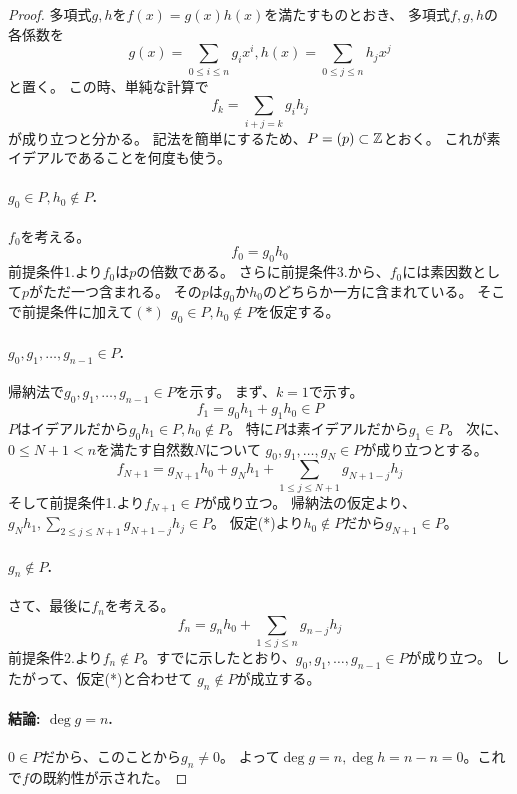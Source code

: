 \documentclass[a4j]{jsarticle}
\begin{document}
\begin{proof}
    多項式$g,h$を$f(x)=g(x) h(x)$を満たすものとおき、
    多項式$f, g, h$の各係数を
    \[ g(x)=\sum_{0 \leq i \leq n}{g_i x^i}, h(x)=\sum_{0 \leq j \leq n}{h_j x^j} \]
    と置く。
    この時、単純な計算で
    \[ f_{k}=\sum_{i+j=k}{g_i h_j} \]
    が成り立つと分かる。
    記法を簡単にするため、$P=(p) \subset \mathbb{Z}$とおく。
    これが素イデアルであることを何度も使う。

    \paragraph{$g_0 \in P, h_0 \not \in P$.}
    $f_0$を考える。
    \[ f_0=g_0 h_0 \]
    前提条件1.より$f_0$は$p$の倍数である。
    さらに前提条件3.から、$f_0$には素因数として$p$がただ一つ含まれる。
    その$p$は$g_0$か$h_0$のどちらか一方に含まれている。
    そこで前提条件に加えて$(*)~~g_0 \in P, h_0 \not \in P$を仮定する。

    \paragraph{$g_0, g_1, \dots, g_{n-1} \in P$.}
    帰納法で$g_0, g_1, \dots, g_{n-1} \in P$を示す。
    まず、$k=1$で示す。
    \[ f_1=g_0 h_1 + g_1 h_0 \in P \]
    $P$はイデアルだから$g_0 h_1 \in P, h_0 \not \in P$。
    特に$P$は素イデアルだから$g_1 \in P$。
    次に、$0 \leq N+1 < n$を満たす自然数$N$について
    $g_0, g_1, \dots, g_{N} \in P$が成り立つとする。
    \[ f_{N+1}=g_{N+1} h_0+g_{N} h_1+\sum_{1 \leq j \leq N+1}{g_{N+1-j} h_j } \]
    そして前提条件1.より$f_{N+1} \in P$が成り立つ。
    帰納法の仮定より、$g_{N} h_1, \sum_{2 \leq j \leq N+1}{g_{N+1-j} h_j } \in P$。
    仮定(*)より$h_0 \not \in P$だから$g_{N+1} \in P$。

    \paragraph{$g_n \not \in P$.}
    さて、最後に$f_n$を考える。
    \[ f_{n}=g_{n} h_0+\sum_{1 \leq j \leq n}{g_{n-j} h_j } \]
    前提条件2.より$f_{n} \not \in P$。すでに示したとおり、$g_0, g_1, \dots, g_{n-1} \in P$が成り立つ。
    したがって、仮定(*)と合わせて
    $g_n \not \in P$が成立する。

    \paragraph{結論: $\deg g=n$.}
    $0 \in P$だから、このことから$g_n \neq 0$。
    よって$\deg g=n, \deg h=n-n=0$。これで$f$の既約性が示された。
\end{proof}
\end{document}
